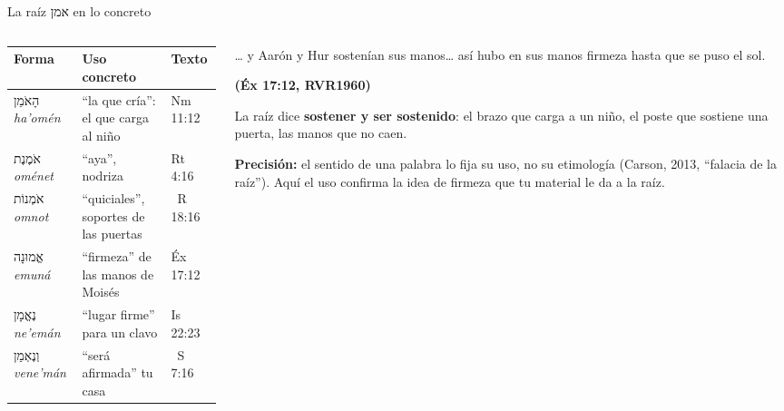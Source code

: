 \documentclass[hyperref={bookmarks=false},aspectratio=169]{beamer}
\newcommand{\heb}[1]{\mbox{\foreignlanguage{hebrew}{#1}}}
\newcommand{\fuente}[1]{\par\hfill{\upshape\bfseries\footnotesize\textcolor{azul}{#1}}}
\newcommand{\destacar}[1]{\textbf{\textcolor{azul}{#1}}}
\newcommand{\precision}[1]{{\footnotesize\color{gris}\textbf{Precisión:} #1}}
\begin{document}
\begin{frame}{La raíz \heb{אמן} en lo concreto}
\begin{columns}[t,onlytextwidth]
\begin{column}{0.55\textwidth}
\scriptsize\renewcommand{\arraystretch}{1.16}
\begin{tabular}{@{}>{\RaggedRight\arraybackslash}p{2.0cm}>{\RaggedRight\arraybackslash}p{2.5cm}>{\RaggedRight\arraybackslash}p{1.6cm}@{}}
\toprule
\textbf{Forma} & \textbf{Uso concreto} & \textbf{Texto} \\ \midrule
\heb{הָאֹמֵן} \emph{ha'omén} & ``la que cría'': el que carga al niño & Nm 11:12 \\
\heb{אֹמֶנֶת} \emph{oménet} & ``aya'', nodriza & Rt 4:16 \\
\heb{אֹמְנוֹת} \emph{omnot} & ``quiciales'', soportes de las puertas & 2~R 18:16 \\
\heb{אֱמוּנָה} \emph{emuná} & ``firmeza'' de las manos de Moisés & Éx 17:12 \\
\heb{נֶאֱמָן} \emph{ne'emán} & ``lugar firme'' para un clavo & Is 22:23 \\
\heb{וְנֶאְמַן} \emph{vene'mán} & ``será afirmada'' tu casa & 2~S 7:16 \\
\bottomrule
\end{tabular}
\end{column}
\begin{column}{0.43\textwidth}
\begin{cita}\ldots{} y Aarón y Hur sostenían sus manos\ldots{} así hubo en sus manos firmeza hasta que se puso el sol.\fuente{(Éx 17:12, RVR1960)}\end{cita}
\small La raíz dice \destacar{sostener y ser sostenido}: el brazo que carga a un niño, el poste que sostiene una puerta, las manos que no caen.\par\smallskip
\precision{el sentido de una palabra lo fija su uso, no su etimología (Carson, 2013, ``falacia de la raíz''). Aquí el uso confirma la idea de firmeza que tu material le da a la raíz.}
\end{column}
\end{columns}
\end{frame}
\end{document}
